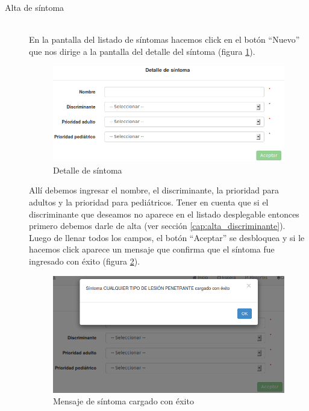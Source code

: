 \begin{description}
\item[Alta de síntoma] \mbox{} \\
En la pantalla del listado de síntomas hacemos click en el botón ``Nuevo'' que nos dirige a la pantalla del detalle del síntoma (figura \ref{fig:detalle_sintoma}).
\begin{figure}
\centerline{\includegraphics[width=1\textwidth]{detalle_sintoma.png}}
\caption{Detalle de síntoma}
\label{fig:detalle_sintoma}
\end{figure}
Allí debemos ingresar el nombre, el discriminante, la prioridad para adultos y la prioridad para pediátricos. Tener en cuenta que si el discriminante que deseamos no aparece en el listado desplegable entonces primero debemos darle de alta (ver sección \ref{cap:alta_discriminante}). Luego de llenar todos los campos, el botón ``Aceptar'' se desbloquea y si le hacemos click aparece un mensaje que confirma que el síntoma fue ingresado con éxito (figura \ref{fig:sintoma_cargado_con_exito}).
\begin{figure}
\centerline{\includegraphics[width=1\textwidth]{sintoma_cargado_con_exito.png}}
\caption{Mensaje de síntoma cargado con éxito}
\label{fig:sintoma_cargado_con_exito}
\end{figure}


\end{description}
